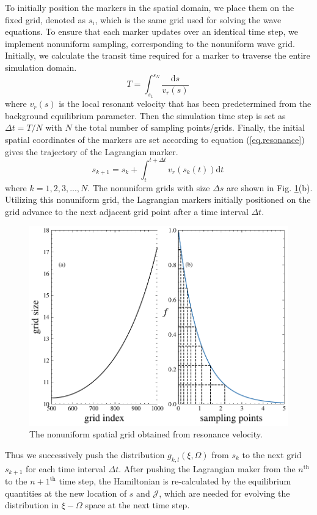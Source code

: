 To initially position the markers in the spatial domain, we place them on the fixed grid, denoted as $s_i$, which is the same grid used for solving the wave equations. To ensure that each marker updates over an identical time step, we implement nonuniform sampling, corresponding to the nonuniform wave grid. Initially, we calculate the transit time required for a marker to traverse the entire simulation domain.
\begin{equation}
    T = \int_{s_1}^{s_N} \frac{\mathrm{d}s}{v_r(s)}~
\end{equation}
where $v_r(s)$ is the local resonant velocity that has been predetermined from the background equilibrium parameter.
Then the simulation time step is set as $\Delta t = T/N$ with $N$ the total number of sampling points/grids.
Finally, the initial spatial coordinates of the markers are set according to equation (\ref{eq.resonance}) gives the trajectory of the Lagrangian marker. 
\begin{equation}
    s_{k+1} = s_k +  \int_{t}^{t+\Delta t} v_r(s_k(t)) \mathrm{d}t~
\end{equation}
where $k=1,2,3,...,N$.
The nonuniform grids with size $\Delta s$ are shown in Fig. \ref{fig.uni_grid}(b). 
Utilizing this nonuniform grid, the Lagrangian markers initially positioned on the grid advance to the next adjacent grid point after a time interval $\Delta t$.
\begin{figure}[htbp]
    \centering
    \includegraphics[scale=0.5]{cpc_img/fig_nu_grid.pdf}
    \caption{The nonuniform spatial grid obtained from resonance velocity. 
    }
    \label{fig.uni_grid}
\end{figure}
Thus we successively push the distribution $g_{k,l}(\xi,\Omega)$  from  $s_k$ to the next grid $s_{k+1}$ for each time interval $\Delta t$.
After pushing the Lagrangian maker from the $n^\mathrm{th}$ to the $n+1^\mathrm{th}$ time step, the Hamiltonian  is re-calculated by  the  equilibrium quantities  at the new location of $s$ and $\mathcal{J}$, which are needed for evolving the distribution in $\xi-\Omega$ space at the next time step.

